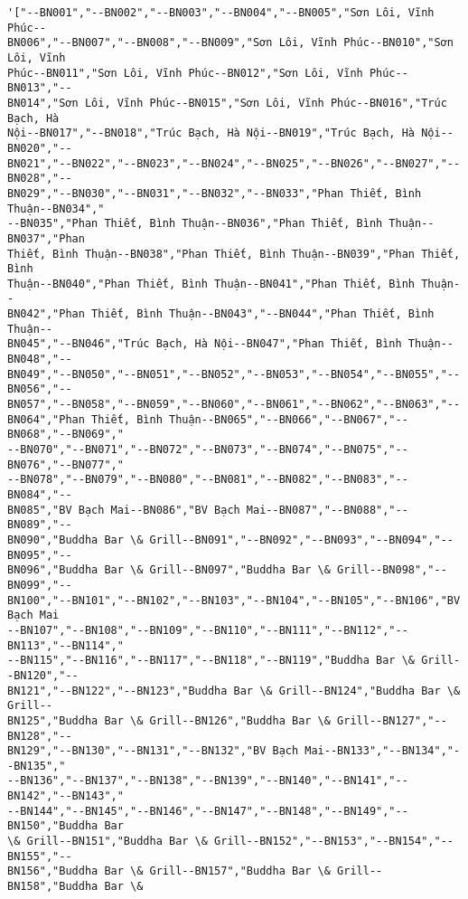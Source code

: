 \documentclass[11pt]{article}
\makeatletter
\newcommand{\boxspacing}{\kern\kvtcb@left@rule\kern\kvtcb@boxsep}
\newcommand{\prompt}[4]{
        \ttfamily\llap{{\color{#2}[#3]:\hspace{3pt}#4}}\vspace{-\baselineskip}
    }
\makeatother
\begin{document}
            \begin{tcolorbox}[breakable, size=fbox, boxrule=.5pt, pad at break*=1mm, opacityfill=0]
\prompt{Out}{outcolor}{330}{\boxspacing}
\begin{Verbatim}[commandchars=\\\{\}]
'["--BN001","--BN002","--BN003","--BN004","--BN005","Sơn Lôi, Vĩnh Phúc--
BN006","--BN007","--BN008","--BN009","Sơn Lôi, Vĩnh Phúc--BN010","Sơn Lôi, Vĩnh
Phúc--BN011","Sơn Lôi, Vĩnh Phúc--BN012","Sơn Lôi, Vĩnh Phúc--BN013","--
BN014","Sơn Lôi, Vĩnh Phúc--BN015","Sơn Lôi, Vĩnh Phúc--BN016","Trúc Bạch, Hà
Nội--BN017","--BN018","Trúc Bạch, Hà Nội--BN019","Trúc Bạch, Hà Nội--BN020","--
BN021","--BN022","--BN023","--BN024","--BN025","--BN026","--BN027","--BN028","--
BN029","--BN030","--BN031","--BN032","--BN033","Phan Thiết, Bình Thuận--BN034","
--BN035","Phan Thiết, Bình Thuận--BN036","Phan Thiết, Bình Thuận--BN037","Phan
Thiết, Bình Thuận--BN038","Phan Thiết, Bình Thuận--BN039","Phan Thiết, Bình
Thuận--BN040","Phan Thiết, Bình Thuận--BN041","Phan Thiết, Bình Thuận--
BN042","Phan Thiết, Bình Thuận--BN043","--BN044","Phan Thiết, Bình Thuận--
BN045","--BN046","Trúc Bạch, Hà Nội--BN047","Phan Thiết, Bình Thuận--BN048","--
BN049","--BN050","--BN051","--BN052","--BN053","--BN054","--BN055","--BN056","--
BN057","--BN058","--BN059","--BN060","--BN061","--BN062","--BN063","--
BN064","Phan Thiết, Bình Thuận--BN065","--BN066","--BN067","--BN068","--BN069","
--BN070","--BN071","--BN072","--BN073","--BN074","--BN075","--BN076","--BN077","
--BN078","--BN079","--BN080","--BN081","--BN082","--BN083","--BN084","--
BN085","BV Bạch Mai--BN086","BV Bạch Mai--BN087","--BN088","--BN089","--
BN090","Buddha Bar \& Grill--BN091","--BN092","--BN093","--BN094","--BN095","--
BN096","Buddha Bar \& Grill--BN097","Buddha Bar \& Grill--BN098","--BN099","--
BN100","--BN101","--BN102","--BN103","--BN104","--BN105","--BN106","BV Bạch Mai
--BN107","--BN108","--BN109","--BN110","--BN111","--BN112","--BN113","--BN114","
--BN115","--BN116","--BN117","--BN118","--BN119","Buddha Bar \& Grill--BN120","--
BN121","--BN122","--BN123","Buddha Bar \& Grill--BN124","Buddha Bar \& Grill--
BN125","Buddha Bar \& Grill--BN126","Buddha Bar \& Grill--BN127","--BN128","--
BN129","--BN130","--BN131","--BN132","BV Bạch Mai--BN133","--BN134","--BN135","
--BN136","--BN137","--BN138","--BN139","--BN140","--BN141","--BN142","--BN143","
--BN144","--BN145","--BN146","--BN147","--BN148","--BN149","--BN150","Buddha Bar
\& Grill--BN151","Buddha Bar \& Grill--BN152","--BN153","--BN154","--BN155","--
BN156","Buddha Bar \& Grill--BN157","Buddha Bar \& Grill--BN158","Buddha Bar \&

\end{Verbatim}
\end{tcolorbox}
\end{document}
